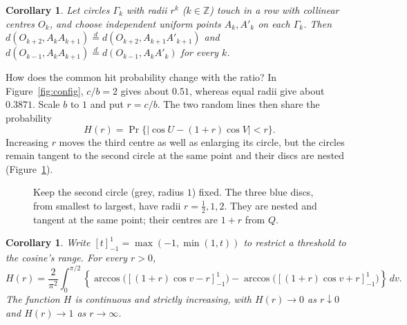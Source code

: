 \documentclass[11pt]{amsart}
\newtheorem{corollary}[theorem]{Corollary}
\theoremstyle{remark}
\newcommand{\eqd}{\overset{d}{=}}
\begin{document}
\begin{corollary}\label{cor:chain}
Let circles $\Gamma_k$ with radii $r^k$ ($k\in\mathbb{Z}$) touch in a row with collinear centres $O_k$, and choose independent uniform points $A_k,A'_k$ on each $\Gamma_k$. Then $d(O_{k+2},A_kA_{k+1})\eqd d(O_{k+2},A_{k+1}A'_{k+1})$ and $d(O_{k-1},A_kA_{k+1})\eqd d(O_{k-1},A_kA'_k)$ for every $k$.
\end{corollary}

How does the common hit probability change with the ratio? In Figure~\ref{fig:config}, $c/b=2$ gives about $0.51$, whereas equal radii give about $0.3871$. Scale $b$ to $1$ and put $r=c/b$. The two random lines then share the probability
\[
H(r)=\Pr\{|\cos U-(1+r)\cos V|<r\}.
\]
Increasing $r$ moves the third centre as well as enlarging its circle, but the circles remain tangent to the second circle at the same point and their discs are nested (Figure~\ref{fig:nested}).


\begin{figure}[ht]
\centering
{}
\caption{Keep the second circle (grey, radius $1$) fixed. The three blue discs, from smallest to largest, have radii $r=\tfrac12,1,2$. They are nested and tangent at the same point; their centres are $1+r$ from $Q$.}
\label{fig:nested}
\end{figure}

\begin{samepage}
\begin{corollary}\label{cor:ratio}
Write $[t]_{-1}^{1}=\max(-1,\min(1,t))$ to restrict a threshold to the cosine's range. For every $r>0$,
\[
H(r)=\frac{2}{\pi^2}\int_0^{\pi/2}
\left\{\arccos\bigl([(1+r)\cos v-r]_{-1}^{1}\bigr)
-\arccos\bigl([(1+r)\cos v+r]_{-1}^{1}\bigr)\right\}\,dv.
\]
The function $H$ is continuous and strictly increasing, with $H(r)\to0$ as $r\downarrow0$ and $H(r)\to1$ as $r\to\infty$.
\end{corollary}
\end{samepage}
\end{document}
